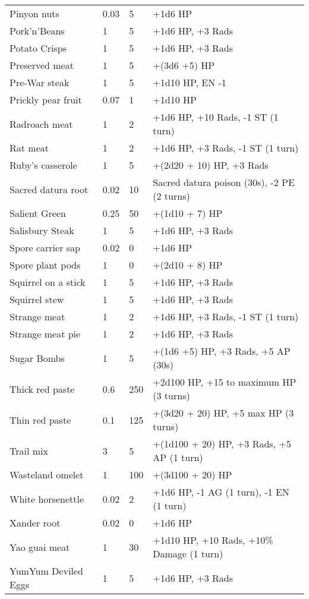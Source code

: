 \begin{longtable}{|p{4cm}|p{1.5cm}|p{1.5cm}|p{9cm}|}
Pinyon nuts & 0.03 & 5 & +1d6 HP \\
Pork'n'Beans & 1 & 5 & +1d6 HP, +3 Rads \\
Potato Crisps & 1 & 5 & +1d6 HP, +3 Rads \\
Preserved meat & 1 & 5 & +(3d6 +5) HP \\
Pre-War steak & 1 & 5 & +1d10 HP, EN -1 \\
Prickly pear fruit & 0.07 & 1 & +1d10 HP \\
Radroach meat & 1 & 2 & +1d6 HP, +10 Rads, -1 ST (1 turn) \\
Rat meat & 1 & 2 & +1d6 HP, +3 Rads, -1 ST (1 turn) \\
Ruby's casserole & 1 & 5 & +(2d20 + 10) HP, +3 Rads \\
Sacred datura root & 0.02 & 10 & Sacred datura poison (30s), -2 PE (2 turns) \\
Salient Green & 0.25 & 50 & +(1d10 + 7) HP \\
Salisbury Steak & 1 & 5 & +1d6 HP, +3 Rads \\
Spore carrier sap & 0.02 & 0 & +1d6 HP \\
Spore plant pods & 1 & 0 & +(2d10 + 8) HP \\
Squirrel on a stick & 1 & 5 & +1d6 HP, +3 Rads \\
Squirrel stew & 1 & 5 & +1d6 HP, +3 Rads \\
Strange meat & 1 & 2 & +1d6 HP, +3 Rads, -1 ST (1 turn) \\
Strange meat pie & 1 & 2 & +1d6 HP, +3 Rads \\
Sugar Bombs & 1 & 5 & +(1d6 +5) HP, +3 Rads, +5 AP (30s) \\
Thick red paste & 0.6 & 250 & +2d100 HP, +15 to maximum HP (3 turns) \\
Thin red paste & 0.1 & 125 & +(3d20 + 20) HP, +5 max HP (3 turns) \\
Trail mix & 3 & 5 & +(1d100 + 20) HP, +3 Rads, +5 AP (1 turn) \\
Wasteland omelet & 1 & 100 & +(3d100 + 20) HP \\
White horsenettle & 0.02 & 2 & +1d6 HP, -1 AG (1 turn), -1 EN (1 turn) \\
Xander root & 0.02 & 0 & +1d6 HP \\
Yao guai meat & 1 & 30 & +1d10 HP, +10 Rads, +10\% Damage (1 turn) \\
YumYum Deviled Eggs & 1 & 5 & +1d6 HP, +3 Rads \\
\hline

\end{longtable}
